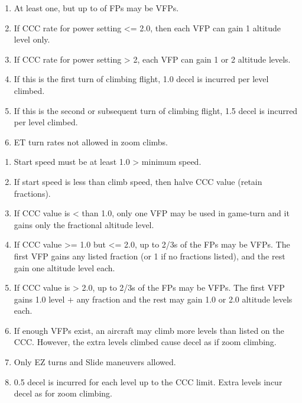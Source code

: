 \begin{table*}
\begin{multicols}{2}
\begin{enumerate}[nosep]
    \item At least one, but up to {\twothirds} of FPs may be VFPs.
    \item If CCC rate for power setting <= 2.0, then each VFP can gain 1 altitude level only.
    \item If CCC rate for power setting > 2, each VFP can gain 1 or 2 altitude levels.
    \item If this is the first turn of climbing flight, 1.0 decel is incurred per level climbed.
    \item If this is the second or subsequent turn of climbing flight, 1.5 decel is incurred per level climbed.
    \item ET turn rates not allowed in zoom climbs.
\end{enumerate}

\begin{enumerate}[nosep]
    \item Start speed must be at least 1.0 > minimum speed.
    \item If start speed is less than climb speed, then halve CCC value (retain fractions).
    \item If CCC value is < than 1.0, only one VFP may be used in game-turn and it gains only the fractional altitude level.
    \item If CCC value >= 1.0 but <= 2.0, up to 2/3s of the FPs may be VFPs. The first VFP gains any listed fraction (or 1 if no fractions listed), and the rest gain one altitude level each.
    \item If CCC value is > 2.0, up to 2/3s of the FPs may be VFPs. The first VFP gains 1.0 level $+$ any fraction and the rest may gain 1.0 or 2.0 altitude levels each.
    \item If enough VFPs exist, an aircraft may climb more levels than listed on the CCC. However, the extra levels climbed cause decel as if zoom climbing.
    \item Only EZ turns and Slide maneuvers allowed.
    \item 0.5 decel is incurred for each level up to the CCC limit. Extra levels incur decel as for zoom climbing.
\end{enumerate}


\end{multicols}
\end{table*}
